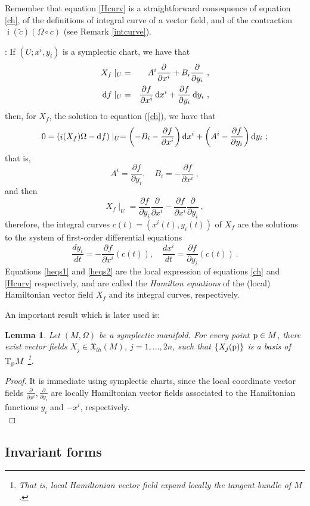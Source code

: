 \documentclass[12pt]{report}
\newtheorem{lem}[teor]{Lemma}
\def\beq{\begin{equation}}
\def\eeq{\end{equation}}
\def\derpar#1#2{\frac{\partial{#1}}{\partial{#2}}}
\def\qed{\ifvmode\removelastskip\fi
{\unskip\nobreak\hfil\penalty50\hbox{}\nobreak\hfil
\hbox{\vrule height1.2ex width1.2ex}\parfillskip=0pt
\finalhyphendemerits=0 \par\smallskip}}
\def\vf{\mathfrak X}
\def\d{{\rm d}}
\def\Tan{{\rm T}}
\def\inn{\mathop{i}\nolimits}
\begin{document}
Remember that equation \eqref{Hcurv} is a straightforward consequence of equation \eqref{ch}, 
of the definitions of integral curve of a vector field, and of the contraction 
$\inn(\widetilde c)(\Omega\circ c)$
(see Remark \ref{intcurve}).

:
If $(U;x^i,y_i)$ is a symplectic chart, we have that
\begin{eqnarray*}
X_{f}\mid_U &=& A^i\derpar{}{x^i}+B_i\derpar{}{y_i} \ ,
\\
\d f\mid_U &=& \derpar{f}{x^i}\,\d x^i + \derpar{f}{y_i}\,\d y_i \ ,
\end{eqnarray*}
then, for $X_{f}$, the solution to equation (\ref{ch}), we have that
$$
0 = (\inn(X_{f})\Omega - \d f)\mid_U
=\left( -B_i - \derpar{f}{x^i}\right)\d x^i +
\left( A^i - \derpar{f}{y_i}\right)\d y_i \ ;
$$
that is,
\beq
A^i = \derpar{f}{y_i} ,\quad B_i= -\derpar{f}{x^i} \ ,
\label{heqs1}
\eeq
and then
\beq
\label{eq:locHvf}
X_{f}\mid_U = \derpar{f}{y_i}\derpar{}{x^i}-\derpar{f}{x^i}\derpar{}{y_i} \ ,
\eeq
 therefore, the integral curves $c(t)=(x^i(t),y_i(t))$ of $X_{f}$ are the solutions to the system of 
first-order differential equations
\beq
\frac{d y_i}{d t} = -\derpar{f}{x^i}(c(t))
,\quad
\frac{d x^i}{d t} = \derpar{f}{y_i}(c(t)) \ .
\label{heqs2}
\eeq
Equations \eqref{heqs1} and  \eqref{heqs2} are the local expression of equations 
 \eqref{ch} and \eqref{Hcurv} respectively, and are called the {\sl Hamilton equations} 
of the (local) Hamiltonian vector field $X_{f}$ and its integral curves, respectively.

An important result which is later used is:

\begin{lem}
Let $(M,\Omega)$ be a symplectic manifold.
For every point ${\rm p}\in M$, there exist vector fields $X_j\in\vf_{lh}(M)$, $j=1,\ldots ,2n$,
such that $\{ X_j({\rm p})\}$ is a basis of $\Tan_{\rm p}M$ 
\footnote{
That is, local Hamiltonian vector field expand locally the
tangent bundle of $M$.
}.
\label{auxil}
\end{lem}
\begin{proof}
It is immediate using symplectic charts,
since the local coordinate vector fields 
$\displaystyle\derpar{}{x^i},\derpar{}{y_i}$
are locally Hamiltonian vector fields associated to the Hamiltonian functions
$y_i$ and $-x^i$, respectively.
\\ \qed  \end{proof}



\subsection{Invariant forms}
\end{document}

